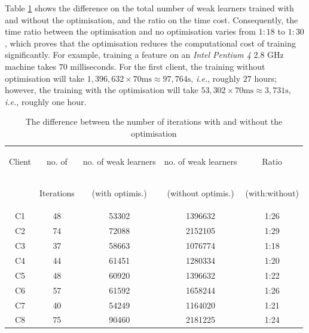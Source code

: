 \mbox{Table} \ref{tab:comparisonratio} shows the difference on the total number of weak learners trained with and without the optimisation, and the ratio on the time cost. Consequently, the time ratio between the optimisation and no optimisation varies from $1:18$ to $1:30$, which proves that the optimisation reduces the computational cost of training significantly. For example, training a feature on an \textit{Intel Pentium 4} 2.8 GHz machine takes $70$ milliseconds. For the first client, the training without optimisation will take $1,396,632\times 70\textrm{ms}\approx 97,764\textrm{s}$, \textit{i.e.}, roughly $27$ hours; however, the training with the optimisation will take $53,302\times 70\textrm{ms}\approx 3,731\textrm{s}$, \textit{i.e.}, roughly one hour.
\begin{table}[ht]
\begin{center}
\caption{The difference between the number of iterations with and without the optimisation}
 \begin{tabular}{|c|c|c|c|c|}
  \hline
  \begin{small}Client\end{small} & \begin{small}no. of\end{small} & \begin{small}no. of weak learners\end{small} & \begin{small}no. of weak learners\end{small} & \begin{small}Ratio\end{small}\\ 
      & \begin{small}Iterations\end{small} & \begin{small}(with optimis.)\end{small} & \begin{small}(without optimis.)\end{small} & \begin{small}(with:without)\end{small}\\
   \hline
   C1 & 48 & 53302 & 1396632 & 1:26\\
   C2 & 74 & 72088 & 2152105 & 1:29\\
   C3 & 37 & 58663 & 1076774 & 1:18\\
   C4 & 44 & 61451 & 1280334 & 1:20\\
   C5 & 48 & 60920 & 1396632 & 1:22\\
   C6 & 57 & 61592 & 1658244 & 1:26\\
   C7 & 40 & 54249 & 1164020 & 1:21\\
   C8 & 75 & 90460 & 2181225 & 1:24\\
  \hline
 \end{tabular}
\label{tab:comparisonratio}
\end{center}
\end{table}

